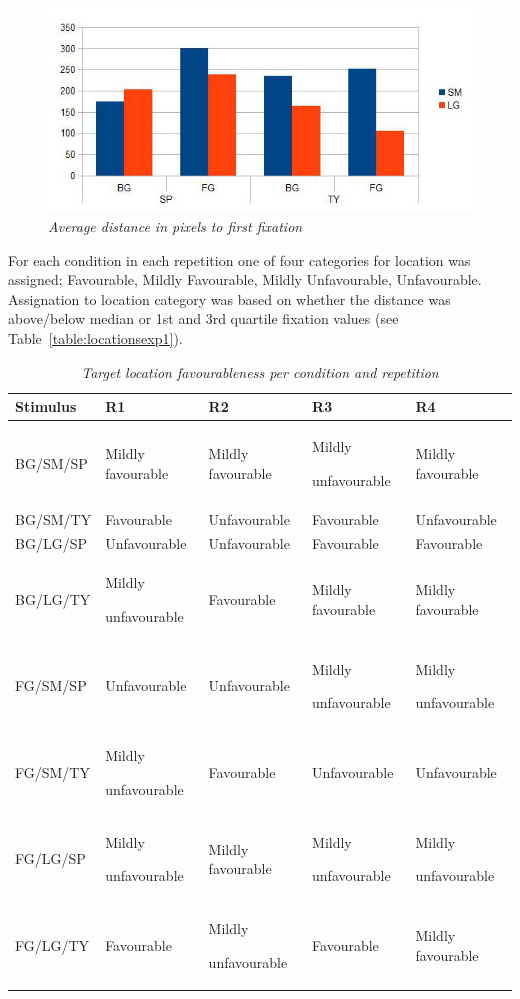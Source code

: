 \begin{figure}[h!]
	\centering
       \includegraphics[scale=0.40]{fixations.jpg}
       \caption{\textit{Average distance in pixels to first fixation}}
       \label{fig:fixationsexp1}
\end{figure}


For each condition in each repetition one of four categories for location was assigned; Favourable, Mildly Favourable, Mildly Unfavourable, Unfavourable. Assignation to location category was based on whether the distance was above/below median or 1st and 3rd quartile fixation values (see Table~\vref{table:locationsexp1}).

\begin{table}
\centering
\caption{\textit{Target location favourableness per condition and repetition}}
\begin{tabular}{|p{2cm}|p{2.5cm}|p{2.5cm}|p{2.5cm}|p{2.5cm}|} \hline
\textbf{Stimulus}&\textbf{R1}&\textbf{R2}&\textbf{R3}&\textbf{R4}\\ \hline
BG/SM/SP&Mildly favourable&Mildly favourable&Mildly\par unfavourable&Mildly favourable\\ \hline
BG/SM/TY&Favourable&Unfavourable&Favourable&Unfavourable\\ \hline
BG/LG/SP&Unfavourable&Unfavourable&Favourable&Favourable\\ \hline
BG/LG/TY&Mildly\par unfavourable&Favourable&Mildly favourable&Mildly favourable\\ \hline
FG/SM/SP&Unfavourable&Unfavourable&Mildly\par unfavourable&Mildly\par unfavourable\\ \hline
FG/SM/TY&Mildly\par unfavourable&Favourable&Unfavourable&Unfavourable\\ \hline
FG/LG/SP&Mildly\par unfavourable&Mildly favourable&Mildly\par unfavourable&Mildly\par unfavourable\\ \hline
FG/LG/TY&Favourable&Mildly\par unfavourable&Favourable&Mildly favourable\\ \hline
\end{tabular}
\label{table:locationsexp1}
\end{table}

